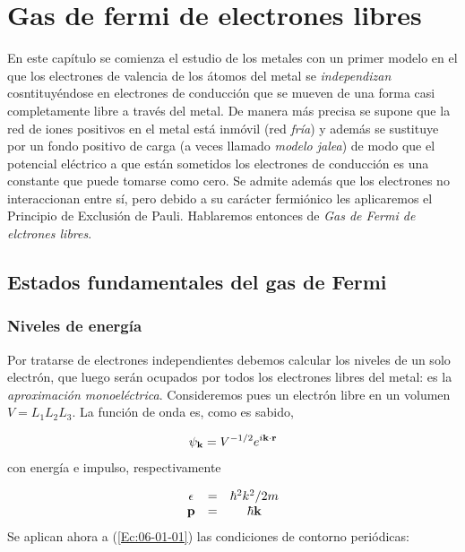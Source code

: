 \chapter{Gas de fermi de electrones libres} \label{Ch:06}

En este capítulo se comienza el estudio de los metales con un primer modelo en el que los electrones de valencia de los átomos del metal se \textit{independizan} cosntituyéndose en electrones de conducción que se mueven de una forma casi completamente libre a través del metal. De manera más precisa se supone que la red de iones positivos en el metal está inmóvil (red \textit{fría}) y además se sustituye por un fondo positivo de carga (a veces llamado \textit{modelo jalea}) de modo que el potencial eléctrico a que están sometidos los electrones de conducción es una constante que puede tomarse como cero. Se admite además que los electrones no interaccionan entre sí, pero debido a su carácter fermiónico les aplicaremos el Principio de Exclusión de Pauli. Hablaremos entonces de \textit{Gas de Fermi de elctrones libres}.

\section{Estados fundamentales del gas de Fermi}

\subsection{Niveles de energía}

Por tratarse de electrones independientes debemos calcular los niveles de un solo electrón, que luego serán ocupados por todos los electrones libres del metal: es la \textit{aproximación monoeléctrica}. Consideremos pues un electrón libre en un volumen $V=L_1L_2L_3$. La función de onda es, como es sabido, 

\begin{equation}
    \psi_{\mathbf{k}} = V^{-1/2} e^{i \mathbf{k} \cdot \mathbf{r}} \label{Ec:06-01-01}
\end{equation}
con energía e impulso, respectivamente 

\begin{equation}
\begin{array}{ccc}
    \epsilon & = &\hbar^2 k^2 /2m \\
    \mathbf{p} &= &  \hbar \mathbf{k}
\end{array}
\end{equation}
Se aplican ahora a (\ref{Ec:06-01-01}) las condiciones de contorno periódicas:

